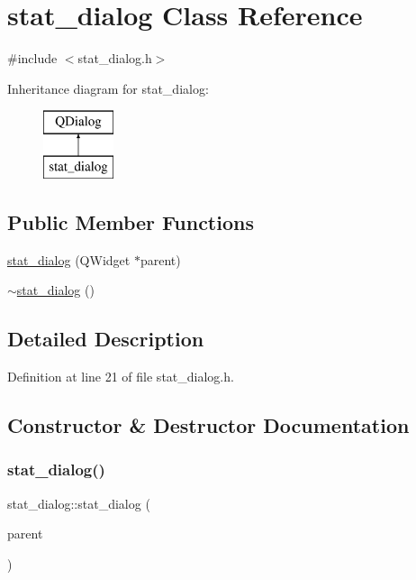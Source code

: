 \hypertarget{classstat__dialog}{}\section{stat\+\_\+dialog Class Reference}
\label{classstat__dialog}


{\ttfamily \#include $<$stat\+\_\+dialog.\+h$>$}

Inheritance diagram for stat\+\_\+dialog\+:\begin{figure}[H]
\begin{center}
\leavevmode
\includegraphics[height=2.000000cm]{classstat__dialog}
\end{center}
\end{figure}
\subsection*{Public Member Functions}
\begin{DoxyCompactItemize}
\item 
\mbox{\hyperlink{classstat__dialog_a4a77448d9196257a4a5e0aebf02a0ab7}{stat\+\_\+dialog}} (Q\+Widget $\ast$parent)
\item 
\mbox{\hyperlink{classstat__dialog_ac628e47d8eb4d3972ec6dbf6f42d6df3}{$\sim$stat\+\_\+dialog}} ()
\end{DoxyCompactItemize}


\subsection{Detailed Description}


Definition at line 21 of file stat\+\_\+dialog.\+h.



\subsection{Constructor \& Destructor Documentation}
\mbox{\label{classstat__dialog_a4a77448d9196257a4a5e0aebf02a0ab7}} 
\subsubsection{\texorpdfstring{stat\_dialog()}{stat\_dialog()}}
{\footnotesize\ttfamily stat\+\_\+dialog\+::stat\+\_\+dialog (\begin{DoxyParamCaption}\item[{Q\+Widget $\ast$}]{parent }\end{DoxyParamCaption})\hspace{0.3cm}{\ttfamily [explicit]}}



